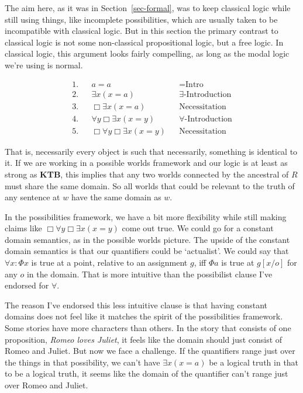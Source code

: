 \documentclass[
  11pt,
  letterpaper,
  DIV=11,
  numbers=noendperiod,
  twoside]{scrartcl}
\begin{document}
The aim here, as it was in Section~\ref{sec-formal}, was to keep
classical logic while still using things, like incomplete possibilities,
which are usually taken to be incompatible with classical logic. But in
this section the primary contrast to classical logic is not some
non-classical propositional logic, but a free logic. In classical logic,
this argument looks fairly compelling, as long as the modal logic we're
using is normal.

\begin{align*}
1. && a = a && \text{=Intro} \\
2. && \exists x(x = a) && \exists\text{-Introduction} \\
3. && \Box  \exists x(x = a) && \text{Necessitation} \\
4. && \forall y \Box  \exists x(x = y) && \forall\text{-Introduction} \\
5. && \Box \forall y \Box  \exists x(x = y) && \text{Necessitation}
\end{align*}

That is, necessarily every object is such that necessarily, something is
identical to it. If we are working in a possible worlds framework and
our logic is at least as strong as \textbf{KTB}, this implies that any
two worlds connected by the ancestral of \(R\) must share the same
domain. So all worlds that could be relevant to the truth of any
sentence at \(w\) have the same domain as \(w\).

In the possibilities framework, we have a bit more flexibility while
still making claims like \(\Box \forall y \Box  \exists x(x = y)\) come
out true. We could go for a constant domain semantics, as in the
possible worlds picture. The upside of the constant domain semantics is
that our quantifiers could be `actualist'. We could say that
\(\forall x: \Phi x\) is true at a point, relative to an assignment
\(g\), iff \(\Phi a\) is true at \(g[x/o]\) for any \(o\) in the domain.
That is more intuitive than the possibilist clause I've endorsed for
\(\forall\).

The reason I've endorsed this less intuitive clause is that having
constant domains does not feel like it matches the spirit of the
possibilities framework. Some stories have more characters than others.
In the story that consists of one proposition, \emph{Romeo loves
Juliet}, it feels like the domain should just consist of Romeo and
Juliet. But now we face a challenge. If the quantifiers range just over
the things in that possibility, we can't have \(\exists x(x = a)\) be a
logical truth in that to be a logical truth, it seems like the domain of
the quantifier can't range just over Romeo and Juliet.
\end{document}
